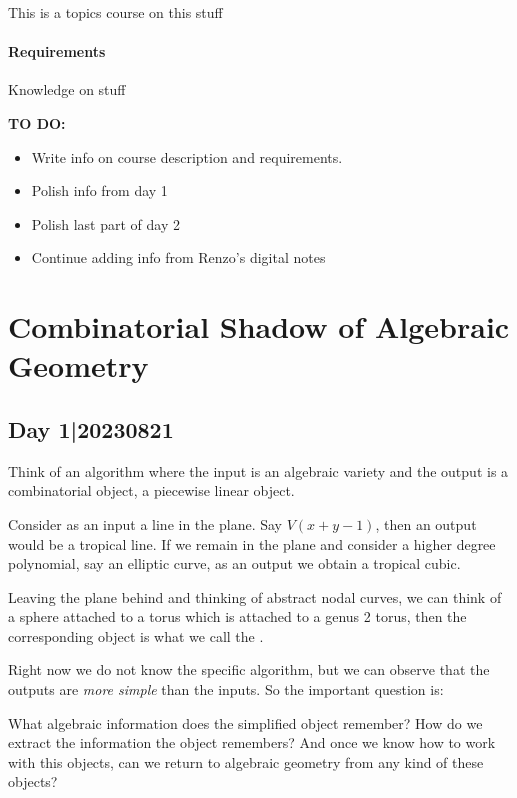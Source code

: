 \documentclass[12pt]{memoir}
\begin{document}
\maketitle
{\small 
\setlength{\parindent}{0em}
\setlength{\parskip}{1em}

This is a topics course on this stuff

\subsubsection*{Requirements}
Knowledge on stuff\par 

\textbf{TO DO:}
\begin{itemize}
    \item Write info on course description and requirements.
    \item Polish info from day 1
    \item Polish last part of day 2
    \item Continue adding info from Renzo's digital notes
\end{itemize}
}
\newpage
\tableofcontents
\chapter{Combinatorial Shadow of Algebraic Geometry}

\section{Day 1|20230821}

Think of an algorithm where the input is an algebraic variety and the output is a combinatorial object, a piecewise linear object.

\begin{Ex}
    Consider as an input a line in the plane. Say $V(x+y-1)$, then an output would be a tropical line. If we remain in the plane and consider a higher degree polynomial, say an elliptic curve, as an output we obtain a tropical cubic.\par 
    Leaving the plane behind and thinking of abstract nodal curves, we can think of a sphere attached to a torus which is attached to a genus 2 torus, then the corresponding object is what we call the .
\end{Ex}

Right now we do not know the specific algorithm, but we can observe that the outputs are \emph{more simple} than the inputs. So the important question is:
\begin{significant}
What algebraic information does the simplified object remember? How do we extract the information the object remembers? And once we know how to work with this objects, can we return to algebraic geometry from any kind of these objects?
\end{significant}
\end{document}
